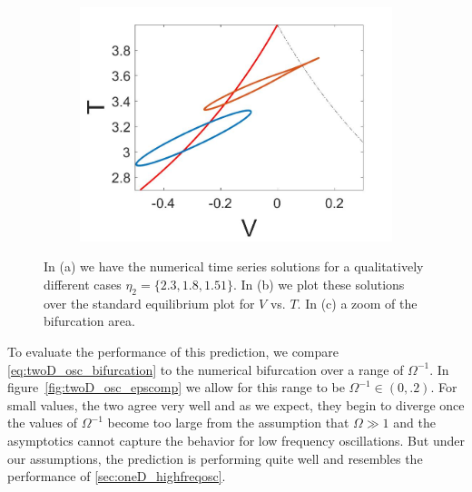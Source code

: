 \begin{figure}[H]
\begin{subfigure}{.5\textwidth}
 \includegraphics[width=\linewidth]{twoD/osc_bif_Tplot_zoom.jpg}
 \caption{}
\end{subfigure}
\caption{In (a) we have the numerical time series solutions for a qualitatively different cases $\eta_2=\{2.3,1.8,1.51\}$. In (b) we plot these solutions over the standard equilibrium plot for $V$ vs. $T$. In (c) a zoom of the bifurcation area.}
\label{fig:twoD_osc_Tnumerics}
\end{figure}

To evaluate the performance of this prediction, we compare \eqref{eq:twoD_osc_bifurcation} to the numerical bifurcation over a range of $\Omega^{-1}$. In figure~\ref{fig:twoD_osc_epscomp} we allow for this range to be $\Omega^{-1}\in (0,.2)$. For small values, the two agree very well and as we expect, they begin to diverge once the values of $\Omega^{-1}$ become too large from the assumption that $\Omega\gg 1$ and the asymptotics cannot capture the behavior for low frequency oscillations. But under our assumptions, the prediction is performing quite well and resembles the performance of \autoref{sec:oneD_highfreqosc}.

